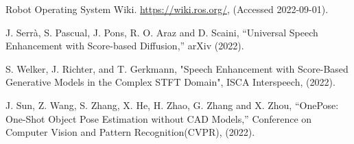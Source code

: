 \documentclass[a4j]{jarticle}
\begin{document}
\begin{thebibliography}{99}

Robot Operating System Wiki. \url{https://wiki.ros.org/}, (Accessed 2022-09-01).

J. Serrà, S. Pascual, J. Pons, R. O. Araz and D. Scaini, “Universal Speech Enhancement with Score-based Diffusion,” arXiv (2022).

S. Welker, J. Richter, and T. Gerkmann, "Speech Enhancement with Score-Based Generative Models in the Complex STFT Domain", ISCA Interspeech, (2022).


J. Sun, Z. Wang, S. Zhang, X. He, H. Zhao, G. Zhang and X. Zhou, “OnePose: One-Shot Object Pose Estimation without CAD Models,” Conference on Computer Vision and Pattern Recognition(CVPR), (2022).

\end{thebibliography}
\end{document}
